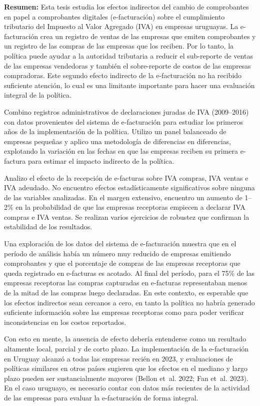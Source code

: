 \textbf{Resumen:} Esta tesis estudia los efectos indirectos del cambio de comprobantes en papel a comprobantes digitales (e-facturación) sobre el cumplimiento tributario del Impuesto al Valor Agregado (IVA) en empresas uruguayas. La e-facturación crea un registro de ventas de las empresas que emiten comprobantes y un registro de las compras de las empresas que los reciben. Por lo tanto, la política puede ayudar a la autoridad tributaria a reducir el sub-reporte de ventas de las empresas vendedoras y también el sobre-reporte de costos de las empresas compradoras. Este segundo efecto indirecto de la e-facturación no ha recibido suficiente atención, lo cual es una limitante importante para hacer una evaluación integral de la política.

Combino registros administrativos de declaraciones juradas de IVA (2009–2016) con datos provenientes del sistema de e-facturación para estudiar los primeros años de la implementación de la política. Utilizo un panel balanceado de empresas pequeñas y aplico una metodología de diferencias en diferencias, explotando la variación en las fechas en que las empresas reciben su primera e-factura para estimar el impacto indirecto de la política. 

Analizo el efecto de la recepción de e-facturas sobre IVA compras, IVA ventas e IVA adeudado. No encuentro efectos estadísticamente significativos sobre ninguna de las variables analizadas. En el margen extensivo, encuentro un aumento de 1–2\% en la probabilidad de que las empresas receptoras empiecen a declarar IVA compras e IVA ventas. Se realizan varios ejercicios de robustez que confirman la estabilidad de los resultados. 

Una exploración de los datos del sistema de e-facturación muestra que en el período de análisis había un número muy reducido de empresas emitiendo comprobantes y que el porcentaje de compras de las empresas receptoras que queda registrado en e-facturas es acotado. Al final del período, para el 75\% de las empresas receptoras las compras capturadas en e-facturas representaban menos de la mitad de las compras luego declaradas. En este contexto, es esperable que los efectos indirectos sean cercanos a cero, en tanto la política no habría generado suficiente información sobre las empresas receptoras como para poder verificar inconsistencias en los costos reportados.

Con esto en mente, la ausencia de efecto debería entenderse como un resultado altamente local, parcial y de corto plazo. La implementación de la e-facturación en Uruguay alcanzó a todas las empresas recién en 2023, y evaluaciones de políticas similares en otros países sugieren que los efectos en el mediano y largo plazo pueden ser sustancialmente mayores (Bellon et~al. 2022; Fan et~al. 2023). En el caso uruguayo, es necesario contar con datos más recientes de la actividad de las empresas para evaluar la e-facturación de forma integral.
